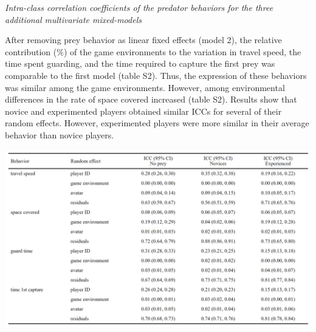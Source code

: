 \documentclass[
  11pt,
]{article}
\let\origfigure\figure
\let\endorigfigure\endfigure
\renewenvironment{figure}[1][2] {
    \expandafter\origfigure\expandafter[H]
} {
    \endorigfigure
}
\begin{document}
\newpage

\begin{center}
\emph{Intra-class correlation coefficients of the predator behaviors for the three additional multivariate mixed-models}
\end{center}

After removing prey behavior as linear fixed effects (model 2), the
relative contribution (\%) of the game environments to the variation in
travel speed, the time spent guarding, and the time required to capture
the first prey was comparable to the first model (table S2). Thus, the
expression of these behaviors was similar among the game environments.
However, among environmental differences in the rate of space covered
increased (table S2). Results show that novice and experimented players
obtained similar ICCs for several of their random effects. However,
experimented players were more similar in their average behavior than
novice players.

\vspace{12pt}

\begin{figure}
\centering
\caption*{\textbf{Table S2:} Posterior means of the ICC estimates for the three additional multivariate mixed-models.}
\includegraphics[width = \linewidth]{tableS2.png}
\end{figure}
\end{document}
